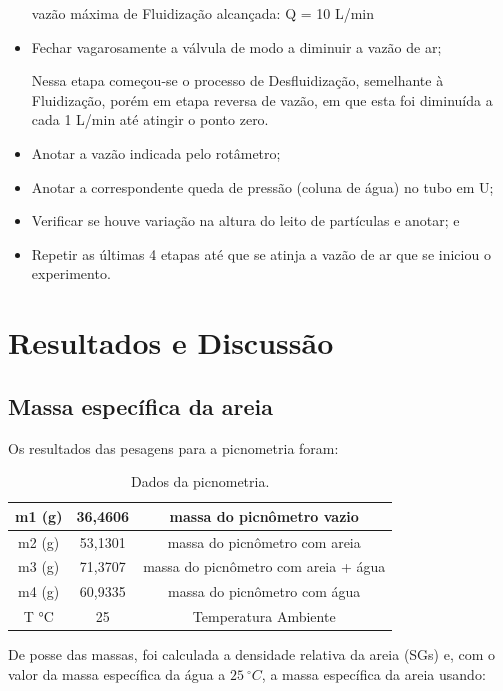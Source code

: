 \begin{itemize}
vazão máxima de Fluidização alcançada: Q = 10 L/min


\item Fechar vagarosamente a válvula de modo a diminuir a vazão de ar;

Nessa etapa começou-se o processo de Desfluidização, semelhante à Fluidização, porém em etapa reversa de vazão, em que esta foi diminuída a cada 1 L/min até atingir o ponto zero.

\item Anotar a vazão indicada pelo rotâmetro;

\item Anotar a correspondente queda de pressão (coluna de água) no tubo em U;

\item Verificar se houve variação na altura do leito de partículas e anotar; e

\item Repetir as últimas 4 etapas até que se atinja a vazão de ar que se iniciou o experimento.
\end{itemize}

\chapter{Resultados e Discussão}

\section{Massa específica da areia}

Os resultados das pesagens para a picnometria foram:

\begin{table}[H]
	\centering
	\begin{tabular}{|c|c|c|}
		\hline
		m1 (g) & 36,4606 & massa do picnômetro vazio            \\ \hline
		m2 (g) & 53,1301 & massa do picnômetro com areia        \\ \hline
		m3 (g) & 71,3707 & massa do picnômetro com areia + água \\ \hline
		m4 (g) & 60,9335 & massa do picnômetro com água         \\ \hline
		T °C   & 25      & Temperatura Ambiente                 \\ \hline
	\end{tabular}
	\caption{Dados da picnometria.}
	\label{table1}
\end{table}

De posse das massas, foi calculada a densidade relativa da areia (SGs) e, com o valor da massa específica da água a $ 25 \ ^{\circ}C $, a massa específica da areia usando:


